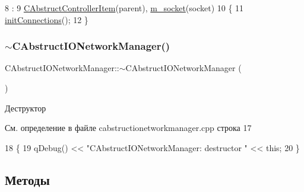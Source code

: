 \begin{DoxyCode}
8                                                                                         :
9     \hyperlink{class_c_abstruct_controller_item_a1d99654a9522cc8721a329d1dcee35a4}{CAbstructControllerItem}(parent), \hyperlink{class_c_abstruct_i_o_network_manager_a0c8754d8191c83c660f43b8c89e39d4e}{m\_socket}(socket)
10 \{
11     \hyperlink{class_c_abstruct_i_o_network_manager_ac01bfefacfa37050c8d3a9317a38fbf5}{initConnections}();
12 \}
\end{DoxyCode}
\hypertarget{class_c_abstruct_i_o_network_manager_ae6a3817e290e0ff8fcbf3d4c6830f5cd}{}\label{class_c_abstruct_i_o_network_manager_ae6a3817e290e0ff8fcbf3d4c6830f5cd} 
\subsubsection{\texorpdfstring{$\sim$\+C\+Abstruct\+I\+O\+Network\+Manager()}{~CAbstructIONetworkManager()}}
{\footnotesize\ttfamily C\+Abstruct\+I\+O\+Network\+Manager\+::$\sim$\+C\+Abstruct\+I\+O\+Network\+Manager (\begin{DoxyParamCaption}{ }\end{DoxyParamCaption})\hspace{0.3cm}{\ttfamily [virtual]}}



Деструктор 



См. определение в файле cabstructionetworkmanager.\+cpp строка 17


\begin{DoxyCode}
18 \{
19     qDebug() << \textcolor{stringliteral}{"CAbstructIONetworkManager: destructor "} << \textcolor{keyword}{this};
20 \}
\end{DoxyCode}


\subsection{Методы}
\hypertarget{class_c_abstruct_i_o_network_manager_a4c25afd753612c5c719944a3e8ef4373}{}\label{class_c_abstruct_i_o_network_manager_a4c25afd753612c5c719944a3e8ef4373} 
